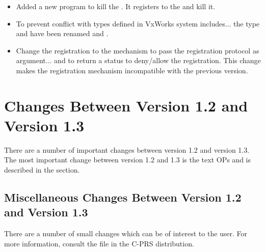 \begin{itemize}
\item Added a new program  to kill the \MP{}. It registers to the
\MP{} and kill it.

\item To prevent conflict with types defined in VxWorks system includes... the
type  and  have been renamed  and
. 

\item Change the registration to the \MP{} mechanism to pass the registration
protocol as argument... and to return a status to deny/allow the registration.
This change makes the registration mechanism incompatible with the previous
version.

\end{itemize}

\section{Changes Between Version 1.2 and Version 1.3}

There are a number of important changes between version 1.2 and version 1.3.
The most important change between version 1.2 and 1.3 is the text OPs and is
described in the  section.



\subsection{Miscellaneous Changes Between Version 1.2 and Version 1.3}

There are a number of small changes which can be of interest to the user. For
more information, consult the  file in the C-PRS distribution.

